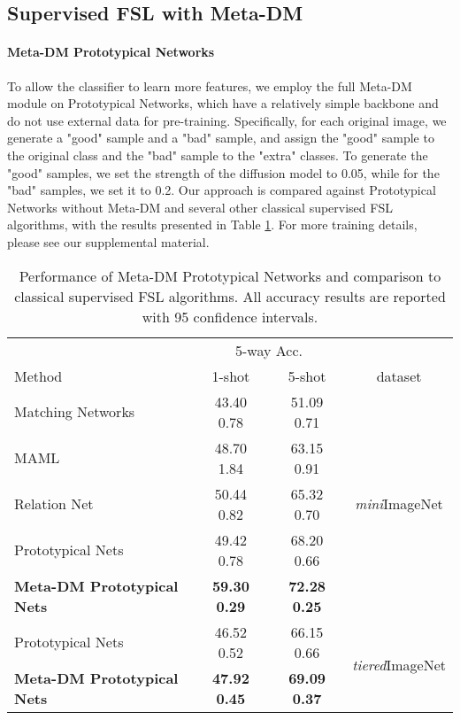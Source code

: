 \documentclass{article}
\begin{document}
\subsection{Supervised FSL with Meta-DM}


\paragraph{Meta-DM  Prototypical Networks} To allow the classifier to learn more features, we employ the full Meta-DM module on Prototypical Networks, which have a relatively simple backbone and do not use external data for pre-training. Specifically, for each original image, we generate a "good" sample and a "bad" sample, and assign the "good" sample to the original class and the "bad" sample to the "extra" classes. To generate the "good" samples, we set the strength of the diffusion model to 0.05, while for the "bad" samples, we set it to 0.2. Our approach is compared against Prototypical Networks without Meta-DM and several other classical supervised FSL algorithms, with the results presented in Table \ref{table1}. For more training details, please see our supplemental material. 


\begin{table}
  \caption{Performance of Meta-DM  Prototypical Networks and comparison to classical supervised FSL algorithms. All accuracy results are reported with 95 confidence intervals. }
  \centering
  \begin{tabular}{lccc}
    \toprule
      & \multicolumn{2}{c}{5-way Acc.} &  \\
    Method     & 1-shot     & 5-shot & dataset \\
    \midrule
    Matching Networks \cite{i2} & 43.40  0.78   & 51.09  0.71  & \multirow{5}{*}{\textit{mini}ImageNet}    \\
    MAML \cite{i9}     & 48.70  1.84  & 63.15  0.91  &     \\
    Relation Net \cite{i4} & 50.44  0.82   & 65.32  0.70  &  \\
    \cmidrule(r){1-3}
    Prototypical Nets \cite{i1} & 49.42  0.78  & 68.20  0.66  &  \\
    \textbf{Meta-DM  Prototypical Nets} & \textbf{59.30  0.29}  &  \textbf{ 72.28  0.25 } &  \\
    \midrule
    Prototypical Nets \cite{i6} & 46.52  0.52  & 66.15  0.66  & \multirow{2}{*}{\textit{tiered}ImageNet} \\
    \textbf{Meta-DM  Prototypical Nets} & \textbf{47.92  0.45}  &  \textbf{ 69.09  0.37 } &  \\
    \bottomrule
  \end{tabular}
  \label{table1}
\end{table}
\end{document}

